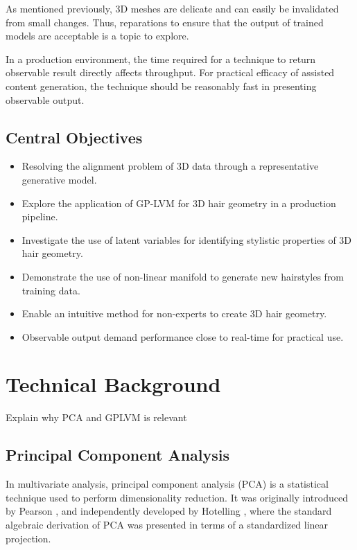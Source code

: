 \documentclass[ %
                    author={Dillon Keith Diep [INCOMPLETE DRAFT, NOT FOR SUBMISSION]},
                supervisor={Dr. Carl Henrik Ek},
                    degree={MEng},
                     title={ARt-CG:},
                  subtitle={Assisted Real-time Content Generation of 3D Hair by Learning Manifolds},
                      type={Research},
                      year={2014} ]{dissertation}
\begin{document}
As mentioned previously, 3D meshes are delicate and can easily be invalidated from small changes. Thus, reparations to ensure that the output of trained models are acceptable is a topic to explore.

In a production environment, the time required for a technique to return observable result directly affects throughput. For practical efficacy of assisted content generation, the technique should be reasonably fast in presenting observable output.

\section{Central Objectives}
\begin{itemize}
\item Resolving the alignment problem of 3D data through a representative generative model.
\item Explore the application of GP-LVM for 3D hair geometry in a production pipeline.
\item Investigate the use of latent variables for identifying stylistic properties of 3D hair geometry.
\item Demonstrate the use of non-linear manifold to generate new hairstyles from training data.
\item Enable an intuitive method for non-experts to create 3D hair geometry.
\item Observable output demand performance close to real-time for practical use.
\end{itemize}


\chapter{Technical Background}
\label{chap:technical}

{\color{red} Explain why PCA and GPLVM is relevant}

\section{Principal Component Analysis}
In multivariate analysis, principal component analysis (PCA) is a statistical technique used to perform dimensionality reduction. It was originally introduced by Pearson \cite{pca1901}, and independently developed by Hotelling \cite{pca1933}, where the standard algebraic derivation of PCA was presented in terms of a standardized linear projection.
\end{document}
